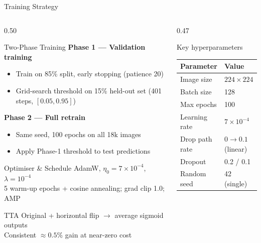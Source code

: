 \documentclass[aspectratio=169]{beamer}
\begin{document}
\begin{frame}[t,shrink=18]{Training Strategy}
  \begin{columns}[T]
    \begin{column}{0.50\textwidth}
      \begin{block}{Two-Phase Training}
        \footnotesize
        \textbf{Phase 1 — Validation training}
        \begin{itemize}
          \item Train on 85\% split, early stopping (patience 20)
          \item Grid-search threshold on 15\% held-out set (401 steps, $[0.05, 0.95]$)
        \end{itemize}
        \textbf{Phase 2 — Full retrain}
        \begin{itemize}
          \item Same seed, 100 epochs on all 18k images
          \item Apply Phase-1 threshold to test predictions
        \end{itemize}
      \end{block}
      \smallskip
      \begin{block}{Optimiser \& Schedule}
        \footnotesize AdamW, $\eta_0\!=\!7{\times}10^{-4}$, $\lambda\!=\!10^{-4}$\\
        5 warm-up epochs + cosine annealing; grad clip 1.0; AMP
      \end{block}
      \smallskip
      \begin{block}{TTA}
        \footnotesize Original + horizontal flip $\to$ average sigmoid outputs\\
        Consistent $\approx\!0.5\%$ gain at near-zero cost
      \end{block}
    \end{column}
    \begin{column}{0.47\textwidth}
      \begin{block}{Key hyperparameters}
        \footnotesize
        \begin{tabular}{ll}
          \toprule
          Parameter & Value \\
          \midrule
          Image size      & $224\times224$ \\
          Batch size      & 128 \\
          Max epochs      & 100 \\
          Learning rate   & $7\times10^{-4}$ \\
          Drop path rate  & $0\to0.1$ (linear) \\
          Dropout         & 0.2 / 0.1 \\
          Random seed     & 42 (single) \\
          \bottomrule
        \end{tabular}
      \end{block}
    \end{column}
  \end{columns}
\end{frame}
\end{document}

